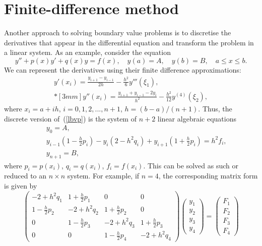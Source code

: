\section{Finite-difference method}

Another approach to solving boundary value problems is to discretise
the derivatives that appear in the differential equation and transform
the problem in a linear system.  As an example, consider the equation
%
\begin{equation}
  y'' + p(x) y' + q(x) y = f(x), \quad y(a)=A, \quad y(b)=B,
  \quad a \le x \le b.\label{lbvp}
\end{equation}
%
We can represent the derivatives using their finite difference
approximations:
%
\begin{equation}
  \begin{array}{l}
    y'(x_i) = \displaystyle \frac{y_{i+1}-y_{i-1}}{2h} -
    \frac{h^2}{6}y'''(\xi_1), \\*[3mm]
    y''(x_i) = \displaystyle \frac{y_{i+1}+y_{i-1}-2 y_i}{h^2} -
    \frac{h^2}{12}y^{(4)}(\xi_2),
  \end{array} \label{er}
\end{equation}
%
where $x_i=a+i h$, $i=0,1,2,...,n+1$, $h=(b-a)/(n+1)$. Thus, the
discrete version of~(\ref{lbvp}) is the system of $n+2$ linear
algebraic equations
%
\begin{eqnarray*}
  & & y_0=A, \\
  & &  y_{i-1} \left ( 1 - \frac{h}{2} p_i \right ) -
  y_i \left ( 2 - h^2 q_i \right ) +
  y_{i+1} \left (1 + \frac{h}{2} p_i \right )  = h^2 f_i , \\
  & & y_{n+1}=B,
\end{eqnarray*}
%
where $p_i=p(x_i)$, $q_i=q(x_i)$, $f_i=f(x_i)$.  This can be solved as
such or reduced to an $n \times n$ system.  For example, if $n=4$, the
corresponding matrix form is given by
%
\begin{equation*}
  \left ( \begin{array}{cccc}
      -2 + h^2 q_1 & 1 + \frac{h}{2} p_1 & 0 & 0 \\
      1 - \frac{h}{2} p_2 & -2  + h^2 q_2 & 1 + \frac{h}{2} p_2 & 0\\
      0 & 1 - \frac{h}{2} p_3 & -2  + h^2 q_3 & 1 + \frac{h}{2} p_3 \\
      0 & 0 & 1 - \frac{h}{2} p_4 & -2  + h^2 q_4
    \end{array} \right )
  \left (\begin{array}{cccc} y_1\\ y_2\\ y_3\\ y_4 \end{array} \right ) =
  \left (\begin{array}{cccc} F_1\\ F_2\\ F_3\\ F_4 \end{array} \right )
\end{equation*}
